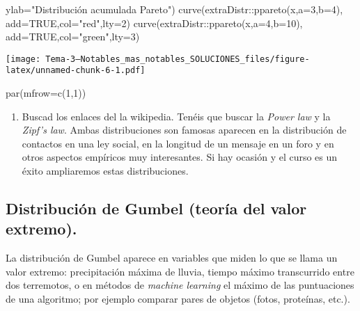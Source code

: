 \documentclass[
]{article}
\newenvironment{Shaded}{\begin{snugshade}}{\end{snugshade}}
\newcommand{\AttributeTok}[1]{\textcolor[rgb]{0.77,0.63,0.00}{#1}}
\newcommand{\ConstantTok}[1]{\textcolor[rgb]{0.00,0.00,0.00}{#1}}
\newcommand{\DecValTok}[1]{\textcolor[rgb]{0.00,0.00,0.81}{#1}}
\newcommand{\FunctionTok}[1]{\textcolor[rgb]{0.00,0.00,0.00}{#1}}
\newcommand{\NormalTok}[1]{#1}
\newcommand{\SpecialCharTok}[1]{\textcolor[rgb]{0.00,0.00,0.00}{#1}}
\newcommand{\StringTok}[1]{\textcolor[rgb]{0.31,0.60,0.02}{#1}}
\providecommand{\tightlist}{%
  \setlength{\itemsep}{0pt}\setlength{\parskip}{0pt}}
\begin{document}
\begin{Shaded}
\begin{Highlighting}[]
      \AttributeTok{ylab=}\StringTok{"Distribución acumulada Pareto"}\NormalTok{)}
\FunctionTok{curve}\NormalTok{(extraDistr}\SpecialCharTok{::}\FunctionTok{ppareto}\NormalTok{(x,}\AttributeTok{a=}\DecValTok{3}\NormalTok{,}\AttributeTok{b=}\DecValTok{4}\NormalTok{),}
      \AttributeTok{add=}\ConstantTok{TRUE}\NormalTok{,}\AttributeTok{col=}\StringTok{"red"}\NormalTok{,}\AttributeTok{lty=}\DecValTok{2}\NormalTok{)}
\FunctionTok{curve}\NormalTok{(extraDistr}\SpecialCharTok{::}\FunctionTok{ppareto}\NormalTok{(x,}\AttributeTok{a=}\DecValTok{4}\NormalTok{,}\AttributeTok{b=}\DecValTok{10}\NormalTok{),}
      \AttributeTok{add=}\ConstantTok{TRUE}\NormalTok{,}\AttributeTok{col=}\StringTok{"green"}\NormalTok{,}\AttributeTok{lty=}\DecValTok{3}\NormalTok{)}
\end{Highlighting}
\end{Shaded}

\texttt{[image: Tema-3---Notables\_mas\_notables\_SOLUCIONES\_files/figure-latex/unnamed-chunk-6-1.pdf]}

\begin{Shaded}
\begin{Highlighting}[]
\FunctionTok{par}\NormalTok{(}\AttributeTok{mfrow=}\FunctionTok{c}\NormalTok{(}\DecValTok{1}\NormalTok{,}\DecValTok{1}\NormalTok{))}
\end{Highlighting}
\end{Shaded}

\begin{enumerate}
\def\labelenumi{\alph{enumi})}
\setcounter{enumi}{5}
\tightlist
\item
  Buscad los enlaces del la wikipedia. Tenéis que buscar la \emph{Power
  law} y la \emph{Zipf's law}. Ambas distribuciones son famosas aparecen
  en la distribución de contactos en una ley social, en la longitud de
  un mensaje en un foro y en otros aspectos empíricos muy interesantes.
  Si hay ocasión y el curso es un éxito ampliaremos estas
  distribuciones.
\end{enumerate}

\hypertarget{distribuciuxf3n-de-gumbel-teoruxeda-del-valor-extremo.}{%
\subsection{\texorpdfstring{\textbf{Distribución de Gumbel (teoría del
valor
extremo)}.}{Distribución de Gumbel (teoría del valor extremo).}}\label{distribuciuxf3n-de-gumbel-teoruxeda-del-valor-extremo.}}

La distribución de Gumbel aparece en variables que miden lo que se llama
un valor extremo: precipitación máxima de lluvia, tiempo máximo
transcurrido entre dos terremotos, o en métodos de \emph{machine
learning} el máximo de las puntuaciones de una algoritmo; por ejemplo
comparar pares de objetos (fotos, proteínas, etc.).
\end{document}
